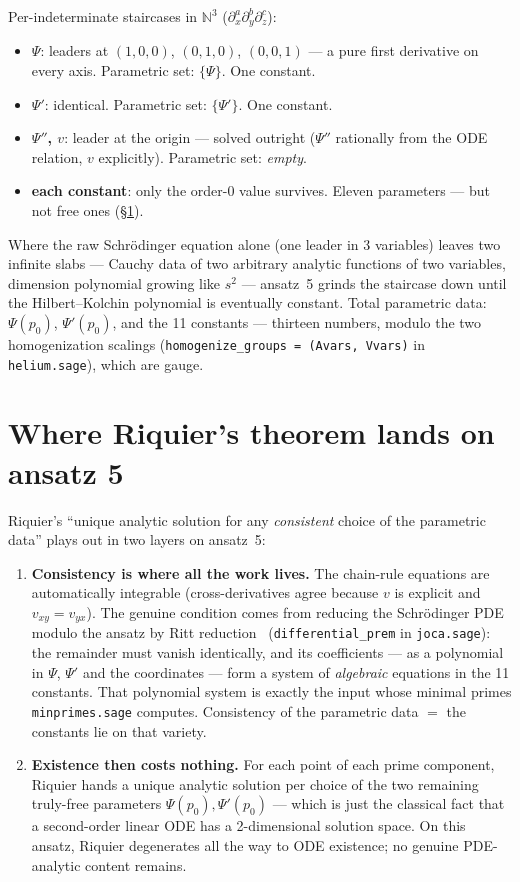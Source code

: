 \documentclass[11pt]{article}
\newcommand{\code}[1]{\texttt{#1}}
\begin{document}
Per-indeterminate staircases in $\mathbb{N}^3$
($\partial_x^a\partial_y^b\partial_z^c$):
\begin{itemize}
\item \textbf{$\Psi$}: leaders at $(1,0,0)$, $(0,1,0)$, $(0,0,1)$ --- a
  pure first derivative on every axis.  Parametric set: $\{\Psi\}$.  One
  constant.
\item \textbf{$\Psi'$}: identical.  Parametric set: $\{\Psi'\}$.  One
  constant.
\item \textbf{$\Psi''$, $v$}: leader at the origin --- solved outright
  ($\Psi''$ rationally from the ODE relation, $v$ explicitly).
  Parametric set: \emph{empty}.
\item \textbf{each constant}: only the order-0 value survives.  Eleven
  parameters --- but not free ones (\S\ref{sec:consistency}).
\end{itemize}

Where the raw Schr\"odinger equation alone (one leader in 3 variables)
leaves two infinite slabs --- Cauchy data of two arbitrary analytic
functions of two variables, dimension polynomial growing like $s^2$ ---
ansatz~5 grinds the staircase down until the Hilbert--Kolchin polynomial
is eventually constant.  Total parametric data: $\Psi(p_0)$,
$\Psi'(p_0)$, and the 11 constants --- thirteen numbers, modulo the two
homogenization scalings (\code{homogenize\_groups = (Avars, Vvars)} in
\code{helium.sage}), which are gauge.

\section{Where Riquier's theorem lands on ansatz 5}
\label{sec:consistency}

Riquier's ``unique analytic solution for any \emph{consistent} choice of
the parametric data'' plays out in two layers on ansatz~5:

\begin{enumerate}
\item \textbf{Consistency is where all the work lives.}  The chain-rule
  equations are automatically integrable (cross-derivatives agree because
  $v$ is explicit and $v_{xy}=v_{yx}$).  The genuine condition comes from
  reducing the Schr\"odinger PDE modulo the ansatz by Ritt
  reduction~\cite{ritt} (\code{differential\_prem} in \code{joca.sage}):
  the remainder must vanish identically, and its coefficients --- as a
  polynomial in $\Psi$, $\Psi'$ and the coordinates --- form a system of
  \emph{algebraic} equations in the 11 constants.  That polynomial system
  is exactly the input whose minimal primes \code{minprimes.sage}
  computes.  Consistency of the parametric data $=$ the constants lie on
  that variety.
\item \textbf{Existence then costs nothing.}  For each point of each
  prime component, Riquier hands a unique analytic solution per choice of
  the two remaining truly-free parameters $\Psi(p_0), \Psi'(p_0)$ ---
  which is just the classical fact that a second-order linear ODE has a
  2-dimensional solution space.  On this ansatz, Riquier degenerates all
  the way to ODE existence; no genuine PDE-analytic content remains.
\end{enumerate}
\end{document}
